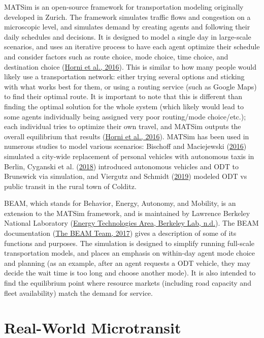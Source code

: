 \documentclass[
]{report}
\begin{document}
MATSim is an open-source framework for transportation modeling originally developed in Zurich. The framework simulates traffic flows and congestion on a microscopic level, and simulates demand by creating agents and following their daily schedules and decisions. It is designed to model a single day in large-scale scenarios, and uses an iterative process to have each agent optimize their schedule and consider factors such as route choice, mode choice, time choice, and destination choice (\protect\hyperlink{ref-Horni2016}{Horni et al., 2016}). This is similar to how many people would likely use a transportation network: either trying several options and sticking with what works best for them, or using a routing service (such as Google Maps) to find their optimal route. It is important to note that this is different than finding the optimal solution for the whole system (which likely would lead to some agents individually being assigned very poor routing/mode choice/etc.); each individual tries to optimize their own travel, and MATSim outputs the overall equilibrium that results (\protect\hyperlink{ref-Horni2016}{Horni et al., 2016}). MATSim has been used in numerous studies to model various scenarios: Bischoff and Maciejewski (\protect\hyperlink{ref-Bischoff2016}{2016}) simulated a city-wide replacement of personal vehicles with autonomous taxis in Berlin, Cyganski et al. (\protect\hyperlink{ref-Cyganski2018}{2018}) introduced autonomous vehicles and ODT to Brunswick via simulation, and Viergutz and Schmidt (\protect\hyperlink{ref-Viergutz2019}{2019}) modeled ODT vs public transit in the rural town of Colditz.

BEAM, which stands for Behavior, Energy, Autonomy, and Mobility, is an extension to the MATSim framework, and is maintained by Lawrence Berkeley National Laboratory (\protect\hyperlink{ref-BEAMlbnl}{Energy Technologies Area, Berkeley Lab, n.d.}). The BEAM documentation (\protect\hyperlink{ref-beamdocs}{The BEAM Team, 2017}) gives a description of some of its functions and purposes. The simulation is designed to simplify running full-scale transportation models, and places an emphasis on within-day agent mode choice and planning (as an example, after an agent requests a ODT vehicle, they may decide the wait time is too long and choose another mode). It is also intended to find the equilibrium point where resource markets (including road capacity and fleet availability) match the demand for service.

\hypertarget{real-world-microtransit}{%
\section{Real-World Microtransit}\label{real-world-microtransit}}
\end{document}
